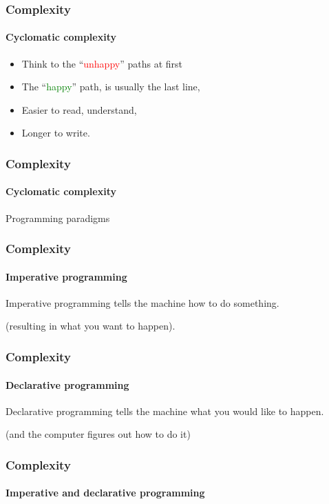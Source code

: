 \begin{frame}
    \frametitle{Complexity}
    \framesubtitle{Cyclomatic complexity}

    \begin{itemize}[<+->]
        \item Think to the ``\textcolor{red}{unhappy}'' paths at first
        \item The ``\textcolor{green}{happy}'' path, is usually the last line,
        \item Easier to read, understand,
        \item Longer to write.
    \end{itemize}
\end{frame}

\begin{frame}[fragile,c]
    \frametitle{Complexity}
    \framesubtitle{Cyclomatic complexity}
    \Huge
    Programming paradigms

\end{frame}

\begin{frame}
    \frametitle{Complexity}
    \framesubtitle{Imperative programming}

    Imperative programming tells the machine how to do something.

    \pause

    (resulting in what you want to happen).
\end{frame}

\begin{frame}
    \frametitle{Complexity}
    \framesubtitle{Declarative programming}

    Declarative programming tells the machine what you would like to happen.

    \pause

    (and the computer figures out how to do it)
\end{frame}

\begin{frame}
    \frametitle{Complexity}
    \framesubtitle{Imperative and declarative programming}


\pause

\end{frame}

